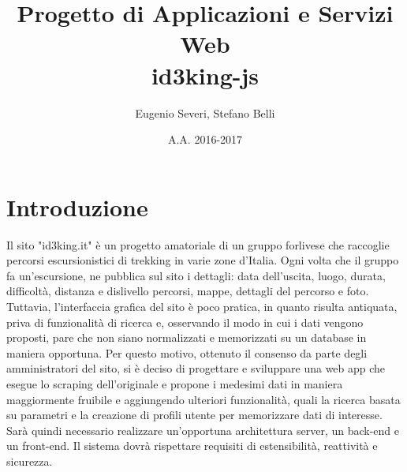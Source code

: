 \documentclass[11pt]{report}
\begin{document}
\title{Progetto di Applicazioni e Servizi Web\\id3king-js}
\author{Eugenio Severi, Stefano Belli}
\date{A.A. 2016-2017}
\begin{titlepage}
	\maketitle
\end{titlepage}

\setcounter{chapter}{1}
\section{Introduzione}
Il sito "id3king.it" è un progetto amatoriale di un gruppo forlivese che raccoglie percorsi escursionistici di trekking in varie zone d'Italia.
Ogni volta che il gruppo fa un'escursione, ne pubblica sul sito i dettagli: data dell'uscita, luogo, durata, difficoltà, distanza e dislivello percorsi, mappe, dettagli del percorso e foto.
\\Tuttavia, l'interfaccia grafica del sito è poco pratica, in quanto risulta antiquata, priva di funzionalità di ricerca e, osservando il modo in cui i dati vengono proposti, pare che non siano normalizzati e memorizzati su un database in maniera opportuna.
Per questo motivo, ottenuto il consenso da parte degli amministratori del sito, si è deciso di progettare e sviluppare una web app che esegue lo scraping dell'originale e propone i medesimi dati in maniera maggiormente fruibile e aggiungendo ulteriori funzionalità, quali la ricerca basata su parametri e la creazione di profili utente per memorizzare dati di interesse.
\\Sarà quindi necessario realizzare un'opportuna architettura server, un back-end e un front-end. Il sistema dovrà rispettare requisiti di estensibilità, reattività e sicurezza.
\end{document}
